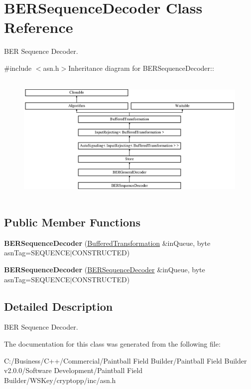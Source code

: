\hypertarget{class_b_e_r_sequence_decoder}{
\section{BERSequenceDecoder Class Reference}
\label{class_b_e_r_sequence_decoder}
}


BER Sequence Decoder.  


{\ttfamily \#include $<$asn.h$>$}Inheritance diagram for BERSequenceDecoder::\begin{figure}[H]
\begin{center}
\leavevmode
\includegraphics[height=6.25698cm]{class_b_e_r_sequence_decoder}
\end{center}
\end{figure}
\subsection*{Public Member Functions}
\begin{DoxyCompactItemize}
\item 
\hypertarget{class_b_e_r_sequence_decoder_a312b01423afcd1c503fa670cdaa7b9d7}{
{\bfseries BERSequenceDecoder} (\hyperlink{class_buffered_transformation}{BufferedTransformation} \&inQueue, byte asnTag=SEQUENCE$|$CONSTRUCTED)}
\label{class_b_e_r_sequence_decoder_a312b01423afcd1c503fa670cdaa7b9d7}

\item 
\hypertarget{class_b_e_r_sequence_decoder_ac896712e69bf4e2d59292c662e44578f}{
{\bfseries BERSequenceDecoder} (\hyperlink{class_b_e_r_sequence_decoder}{BERSequenceDecoder} \&inQueue, byte asnTag=SEQUENCE$|$CONSTRUCTED)}
\label{class_b_e_r_sequence_decoder_ac896712e69bf4e2d59292c662e44578f}

\end{DoxyCompactItemize}


\subsection{Detailed Description}
BER Sequence Decoder. 

The documentation for this class was generated from the following file:\begin{DoxyCompactItemize}
\item 
C:/Business/C++/Commercial/Paintball Field Builder/Paintball Field Builder v2.0.0/Software Development/Paintball Field Builder/WSKey/cryptopp/inc/asn.h\end{DoxyCompactItemize}
